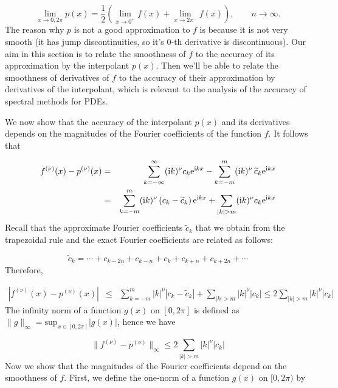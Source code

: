 \documentclass[12pt,landscape]{article}
\begin{document}
{\[
\lim_{x\to 0, 2\pi}p(x) = \frac{1}{2}\left(\lim_{x \to 0^{+}}f(x) + \lim_{x \to 2\pi^{-}}f(x)\right), \qquad n \to \infty.
\]
The reason why $p$ is not a good approximation to $f$ is because it is not very smooth (it has jump discontinuities, so it's $0$-th derivative is discontinuous). Our aim in this section is to relate the smoothness of $f$ to the accuracy of its approximation by the interpolant $p(x)$.  Then we'll be able to relate the smoothness of derivatives of $f$ to the accuracy of their approximation by derivatives of the interpolant, which is relevant to the analysis of the accuracy of spectral methods for PDEs.

We now show that the accuracy of the interpolant $p(x)$ and its derivatives depends on the magnitudes of the Fourier coefficients of the function $f$. It follows that


\begin{eqnarray*}
f^{(\nu)}(x) - p^{(\nu)}(x) & = & \sum_{k=-\infty}^{\infty}({\rm i}k)^{\nu}c_k{\rm e}^{{\rm i}kx} - \sum_{k=-m}^{m}({\rm i}k)^{\nu}\,\widetilde{c}_k{\rm e}^{{\rm i}kx} \\
 &=& \sum_{k=-m}^{m}({\rm i}k)^{\nu}\left(c_k - \widetilde{c}_k\right){\rm e}^{{\rm i}kx} + \sum_{\vert k \vert > m} ({\rm i}k)^{\nu}c_k{\rm e}^{{\rm i}kx}
\end{eqnarray*}
Recall that the approximate Fourier coefficients $\widetilde{c}_k$ that we obtain from the trapezoidal rule and the exact Fourier coefficients are related as follows:

\[
\widetilde{c}_k = \cdots + c_{k-2n} + c_{k-n} +  c_k +  c_{k+n} + c_{k+2n} + \cdots
\]
Therefore,


\begin{eqnarray}
\left\vert f^{(\nu)}(x) - p^{(\nu)}(x) \right\vert & \leq &  \sum_{k=-m}^{m} \vert k\vert^{\nu}\left\vert c_k - \widetilde{c}_k\right\vert + \sum_{\vert k \vert > m} \vert k \vert^{\nu} \vert c_k \vert \leq  2\sum_{\vert k \vert > m} \vert k \vert^{\nu} \vert c_k \vert 
\end{eqnarray}
The infinity norm of a function $g(x)$ on $[0, 2\pi]$ is defined as $\| g \|_{\infty} = \mathrm{sup}_{x\in[0,2\pi]} \vert g(x) \vert$, hence we have

\[
\| f^{(\nu)} - p^{(\nu)}  \|_{\infty} \leq  2\sum_{\vert k \vert > m} \vert k \vert^{\nu} \vert c_k \vert 
\]
Now we show that the magnitudes of the Fourier coefficients depend on the smoothness of $f$. First, we define the one-norm of a function $g(x)$ on $[0, 2\pi)$ by

}
\end{document}
